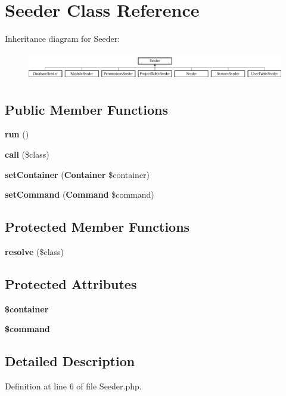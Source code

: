 \section{Seeder Class Reference}
\label{class_illuminate_1_1_database_1_1_seeder}
Inheritance diagram for Seeder\+:\begin{figure}[H]
\begin{center}
\leavevmode
\includegraphics[height=1.212121cm]{class_illuminate_1_1_database_1_1_seeder}
\end{center}
\end{figure}
\subsection*{Public Member Functions}
\begin{DoxyCompactItemize}
\item 
{\bf run} ()
\item 
{\bf call} (\$class)
\item 
{\bf set\+Container} ({\bf Container} \$container)
\item 
{\bf set\+Command} ({\bf Command} \$command)
\end{DoxyCompactItemize}
\subsection*{Protected Member Functions}
\begin{DoxyCompactItemize}
\item 
{\bf resolve} (\$class)
\end{DoxyCompactItemize}
\subsection*{Protected Attributes}
\begin{DoxyCompactItemize}
\item 
{\bf \$container}
\item 
{\bf \$command}
\end{DoxyCompactItemize}


\subsection{Detailed Description}


Definition at line 6 of file Seeder.\+php.



